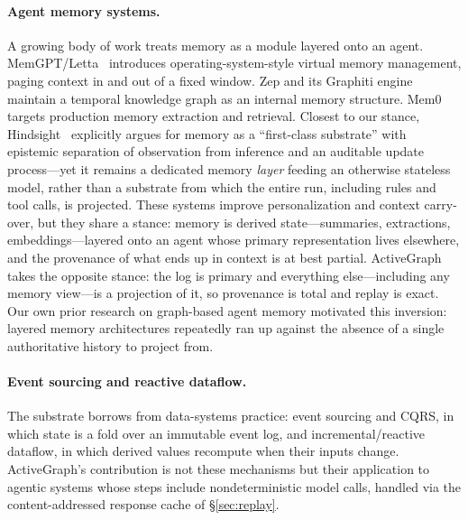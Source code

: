 \documentclass[11pt]{article}
\begin{document}
\paragraph{Agent memory systems.}
A growing body of work treats memory as a module layered onto an agent.
MemGPT/Letta~\cite{memgpt} introduces operating-system-style virtual memory
management, paging context in and out of a fixed window. Zep and its Graphiti
engine~\cite{zep} maintain a temporal knowledge graph as an internal memory
structure. Mem0~\cite{mem0} targets production memory extraction and retrieval. Closest to our
stance, Hindsight~\cite{hindsight} explicitly argues for memory as a ``first-class
substrate'' with epistemic separation of observation from inference and an
auditable update process---yet it remains a dedicated memory \emph{layer} feeding
an otherwise stateless model, rather than a substrate from which the entire run,
including rules and tool calls, is projected. These systems improve personalization and
context carry-over, but they share a stance: memory is derived state---summaries,
extractions, embeddings---layered onto an agent whose primary representation lives
elsewhere, and the provenance of what ends up in context is at best partial.
ActiveGraph takes the opposite stance: the log is primary and everything
else---including any memory view---is a projection of it, so provenance is total
and replay is exact. Our own prior research on graph-based agent memory motivated
this inversion: layered memory architectures repeatedly ran up against the absence
of a single authoritative history to project from.

\paragraph{Event sourcing and reactive dataflow.}
The substrate borrows from data-systems practice: event sourcing and CQRS, in which
state is a fold over an immutable event log, and incremental/reactive dataflow, in
which derived values recompute when their inputs change. ActiveGraph's contribution
is not these mechanisms but their application to agentic systems whose steps include
nondeterministic model calls, handled via the content-addressed response cache of
\S\ref{sec:replay}.
\end{document}
